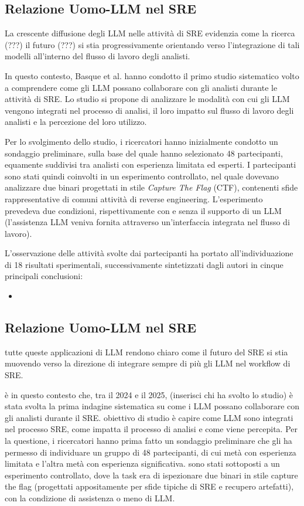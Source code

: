 \subsection{Relazione Uomo-LLM nel SRE}

La crescente diffusione degli LLM nelle attività di SRE evidenzia come la ricerca (???) il futuro (???) si stia progressivamente orientando verso l'integrazione di tali modelli all'interno del flusso di lavoro degli analisti.

In questo contesto, Basque et al. \cite{basque2026decompiling} hanno condotto il primo studio sistematico volto a comprendere come gli LLM possano collaborare con gli analisti durante le attività di SRE. Lo studio si propone di analizzare le modalità con cui gli LLM vengono integrati nel processo di analisi, il loro impatto sul flusso di lavoro degli analisti e la percezione del loro utilizzo.

Per lo svolgimento dello studio, i ricercatori hanno inizialmente condotto un sondaggio preliminare, sulla base del quale hanno selezionato 48 partecipanti, equamente suddivisi tra analisti con esperienza limitata ed esperti. I partecipanti sono stati quindi coinvolti in un esperimento controllato, nel quale dovevano analizzare due binari progettati in stile \textit{Capture The Flag} (CTF), contenenti sfide rappresentative di comuni attività di reverse engineering. L'esperimento prevedeva due condizioni, rispettivamente con e senza il supporto di un LLM (l'assistenza LLM veniva fornita attraverso un'interfaccia integrata nel flusso di lavoro).

L'osservazione delle attività svolte dai partecipanti ha portato all'individuazione di 18 risultati sperimentali, successivamente sintetizzati dagli autori in cinque principali conclusioni:

\begin{itemize}
    \item 
\end{itemize}

\subsection{Relazione Uomo-LLM nel SRE}

tutte queste applicazioni di LLM rendono chiaro come il futuro del SRE si stia muovendo verso la direzione di integrare sempre di più gli LLM nel workflow di SRE.

è in questo contesto che, tra il 2024 e il 2025, (inserisci chi ha svolto lo studio) è stata svolta la prima indagine sistematica su come i LLM possano collaborare con gli analisti durante il SRE. obiettivo di studio è capire come LLM sono integrati nel processo SRE, come impatta il processo di analisi e come viene percepita.
\cite{basque2026decompiling}
Per la questione, i ricercatori hanno prima fatto un sondaggio preliminare che gli ha permesso di individuare un gruppo di 48 partecipanti, di cui metà con esperienza limitata e l'altra metà con esperienza significativa. sono stati sottoposti a un esperimento controllato, dove la task era di ispezionare due binari in stile capture the flag (progettati appositamente per sfide tipiche di SRE e recupero artefatti), con la condizione di assistenza o meno di LLM.

